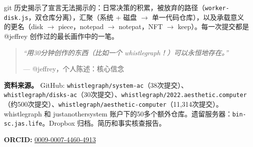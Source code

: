 \documentclass[10pt,letterpaper,twocolumn]{article}
\begin{document}
git 历史揭示了宣言无法揭示的：日常决策的积累，被放弃的路径（\texttt{worker-disk.js}，双仓库分离），汇聚（系统 + 磁盘 $\rightarrow$ 单一代码仓库），以及承载意义的更名（disk $\rightarrow$ piece，notepad $\rightarrow$ notepat，NFT $\rightarrow$ keep）。每一次提交都是 @jeffrey 创作过的最长画作中的一笔。

\begin{quote}
\emph{``用30分钟创作的东西（比如一个 whistlegraph！）可以永恒地存在。''}

--- @jeffrey，个人陈述：核心信念
\end{quote}

\vspace{0.5em}
\noindent\textbf{资料来源。} GitHub: \texttt{whistlegraph/system-ac}（38次提交）、\texttt{whistlegraph/disks-ac}（30次提交）、\texttt{whistlegraph/2022.aesthetic.computer}（约500次提交）、\texttt{whistlegraph/aesthetic-computer}（11,314次提交）。whistlegraph 和 justanothersystem 账户下的50多个额外仓库。遗留服务器：\texttt{bin-sc.jas.life}。Dropbox 归档。简历和事实核查报告。

\vspace{0.5em}
\noindent\textbf{ORCID:} \href{https://orcid.org/0009-0007-4460-4913}{0009-0007-4460-4913}




\end{document}
